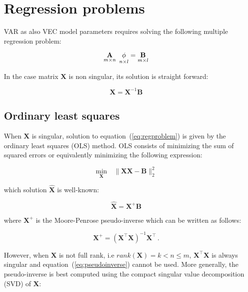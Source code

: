 \section{Regression problems} \label{sec:OLS}

VAR as also VEC model parameters requires solving the following
multiple regression problem:

\begin{equation}
\label{eq:regproblem}
\underset{m \times n}{\mathbf{A}} \enskip \underset{n \times
l}{\mathbf{\phi}} = \underset{m \times l}{\mathbf{B}}
\end{equation}

In the case matrix $\mathbf{X}$ is non singular, its solution is
straight forward:

\begin{equation}
\label{OLSsolution}
    \mathbf{X}=\mathbf{X}^{-1}\mathbf{B}
\end{equation}

\subsection{Ordinary least squares}
When $\mathbf{X}$ is singular, solution to
equation~(\ref{eq:regproblem}) is given by the ordinary least squares
(OLS) method. OLS consists of minimizing the sum of squared errors or
equivalently minimizing the following expression:

\begin{equation}
\label{eq:regressionproblem}
\underset{\mathbf{X}}{\text{min}} \quad \| \mathbf{X}\mathbf{\mathbf{X}} - \mathbf{B} \|_2^2
\end{equation}

\noindent which solution $\hat{\mathbf{X}}$ is well-known:

\begin{equation}
\label{eq:MP}
\hat{\mathbf{X}}=\mathbf{X}^+\mathbf{B}
\end{equation}

\noindent where $\mathbf{X}^+$ is the Moore-Penrose pseudo-inverse
which can be written as follows: 

\begin{equation}
\label{eq:pseudoinverse}
\mathbf{X}^+= (\mathbf{X}^\top \mathbf{X})^{-1}\mathbf{X}^\top \, .
\end{equation}

However, when $\mathbf{X}$ is not full rank, i.e
$rank(\mathbf{X})=k <  n \leq m$, $\mathbf{X}^\top \mathbf{X}$ is
always singular and equation~(\ref{eq:pseudoinverse}) cannot be used.
More generally, the pseudo-inverse is best computed using the compact
singular value decomposition (SVD) of $\mathbf{X}$:

